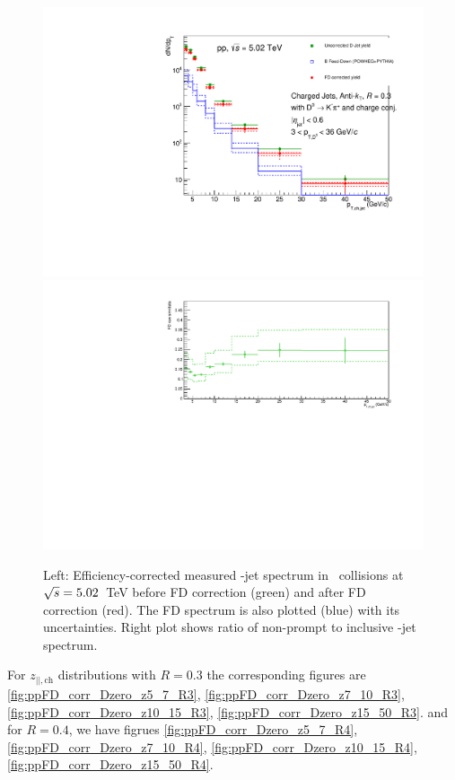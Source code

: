 \begin{figure}[bth]
\centering
\includegraphics[width=.47\textwidth]{pPbcuts_2sig/JetPtSpectra_FDsub}
\includegraphics[width=.522\textwidth]{pPbcuts_2sig/FDratio}
\caption{Left: Efficiency-corrected measured \Dzero-jet spectrum in \pp\ collisions at $\sqrt{s}=5.02$~TeV before FD correction (green) and after FD correction (red). The FD spectrum is also plotted (blue) with its uncertainties. Right plot shows ratio of non-prompt to inclusive \Dzero-jet spectrum.}
\label{fig:pPbFD_corr_Dzero}
\end{figure}

For $z_{||,\text{ch}}$ distributions with $R=0.3$ the corresponding figures are 
 \ref{fig:ppFD_corr_Dzero_z5_7_R3}, \ref{fig:ppFD_corr_Dzero_z7_10_R3}, \ref{fig:ppFD_corr_Dzero_z10_15_R3}, \ref{fig:ppFD_corr_Dzero_z15_50_R3}.
and for $R=0.4$, we have figrues \ref{fig:ppFD_corr_Dzero_z5_7_R4}, \ref{fig:ppFD_corr_Dzero_z7_10_R4}, \ref{fig:ppFD_corr_Dzero_z10_15_R4}, \ref{fig:ppFD_corr_Dzero_z15_50_R4}.

